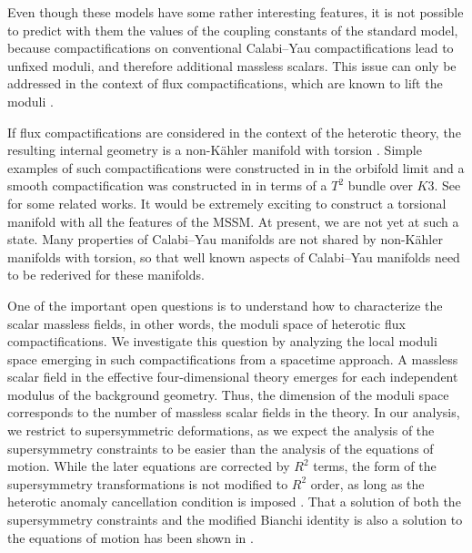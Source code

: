 Even though these models have some rather interesting features, it
is not possible to predict with them the values of the coupling
constants of the standard model, because compactifications on
conventional Calabi--Yau compactifications lead to unfixed moduli,
and therefore additional massless scalars. This issue can
only be addressed in the context of flux compactifications, which
are known to lift the moduli .


If flux compactifications are considered in the context of the
heterotic theory, the resulting internal geometry is a
non-K\"ahler manifold with torsion . Simple
examples of such compactifications were constructed in
 in the orbifold limit and a smooth
compactification was constructed in  in terms of
a $T^2$ bundle over $K3$. See 
for some related works. It would be extremely exciting to
construct a torsional manifold with all the features of the MSSM.
At present, we are not yet at such a state. Many properties of
Calabi--Yau manifolds are not shared by non-K\"ahler manifolds
with torsion, so that well known aspects of Calabi--Yau manifolds
need to be rederived for these manifolds.


One of the important open questions is to understand how to
characterize the scalar massless fields, in other words, the
moduli space of heterotic flux compactifications. We investigate
this question by analyzing the local moduli space emerging in such
compactifications from a spacetime approach. A massless scalar
field in the effective four-dimensional theory emerges for each
independent modulus of the background geometry. Thus, the
dimension of the moduli space corresponds to the number of
massless scalar fields in the theory. In our analysis, we restrict
to supersymmetric deformations, as we expect the analysis of the
supersymmetry constraints to be easier than the analysis of the
equations of motion. While the later equations are corrected by
$R^2$ terms, the form of the supersymmetry transformations is not
modified to $R^2$ order, as long as the heterotic anomaly
cancellation condition is imposed \berroo.  That a solution of
both the supersymmetry constraints and the modified Bianchi
identity is also a solution to the equations of motion has been
shown in .


